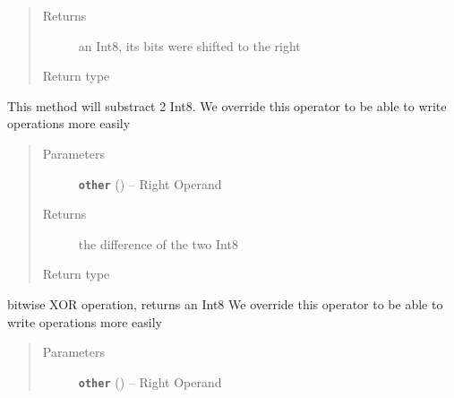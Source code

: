 \documentclass[letterpaper,10pt,english]{sphinxmanual}
\begin{document}
\begin{fulllineitems}
\begin{fulllineitems}
\begin{quote}
\begin{description}
\item[{Returns}] \leavevmode
an Int8, its bits were shifted to the right

\item[{Return type}] \leavevmode
{\hyperref[datatypes.integers:datatypes.integers.Int8.Int8]{}}

\end{description}\end{quote}

\end{fulllineitems}


\begin{fulllineitems}
\label{datatypes.integers:datatypes.integers.Int8.Int8.__sub__}
This method will substract 2 Int8.
We override this operator to be able to write operations more easily
\begin{quote}\begin{description}
\item[{Parameters}] \leavevmode
\textbf{\texttt{other}} ({\hyperref[datatypes.integers:datatypes.integers.Int8.Int8]{}}) -- Right Operand

\item[{Returns}] \leavevmode
the difference of the two Int8

\item[{Return type}] \leavevmode
{\hyperref[datatypes.integers:datatypes.integers.Int8.Int8]{}}

\end{description}\end{quote}

\end{fulllineitems}


\begin{fulllineitems}
\label{datatypes.integers:datatypes.integers.Int8.Int8.__xor__}
bitwise XOR operation, returns an Int8
We override this operator to be able to write operations more easily
\begin{quote}\begin{description}
\item[{Parameters}] \leavevmode
\textbf{\texttt{other}} ({\hyperref[datatypes.integers:datatypes.integers.Int8.Int8]{}}) -- Right Operand


\end{description}
\end{quote}
\end{fulllineitems}
\end{fulllineitems}
\end{document}
